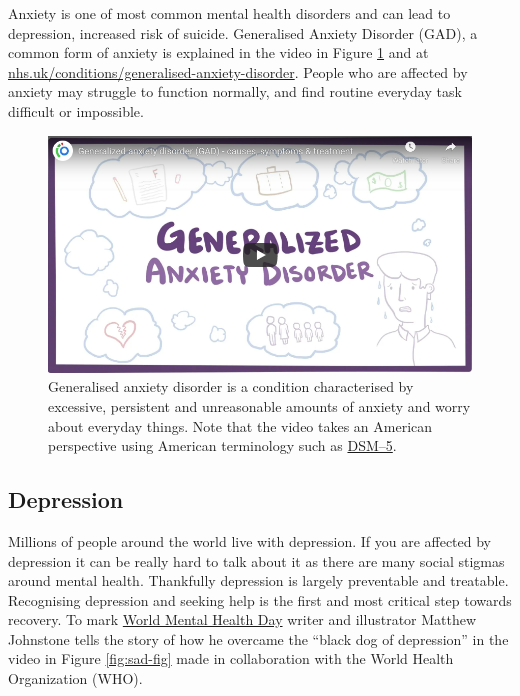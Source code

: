 \documentclass[
]{book}
\begin{document}
Anxiety is one of most common mental health disorders and can lead to depression, increased risk of suicide. Generalised Anxiety Disorder (GAD), a common form of anxiety is explained in the video in Figure \ref{fig:anxious-fig} and at \href{https://www.nhs.uk/conditions/generalised-anxiety-disorder/}{nhs.uk/conditions/generalised-anxiety-disorder}. People who are affected by anxiety may struggle to function normally, and find routine everyday task difficult or impossible.

\begin{figure}

{\centering \includegraphics[width=0.99\linewidth]{images/youtube-anxiety} 

}

\caption{Generalised anxiety disorder is a condition characterised by excessive, persistent and unreasonable amounts of anxiety and worry about everyday things. \citep{youtube-anxiety} Note that the video takes an American perspective using American terminology such as \href{https://www.psychiatry.org/psychiatrists/practice/dsm}{DSM--5}.}\label{fig:anxious-fig}
\end{figure}



\hypertarget{depression}{%
\subsection{Depression}\label{depression}}

Millions of people around the world live with depression. If you are affected by depression it can be really hard to talk about it as there are many social stigmas around mental health. Thankfully depression is largely preventable and treatable. Recognising depression and seeking help is the first and most critical step towards recovery. To mark \href{https://en.wikipedia.org/wiki/World_Mental_Health_Day}{World Mental Health Day} writer and illustrator Matthew Johnstone tells the story of how he overcame the ``black dog of depression'' in the video in Figure \ref{fig:sad-fig} made in collaboration with the World Health Organization (WHO).
\end{document}
